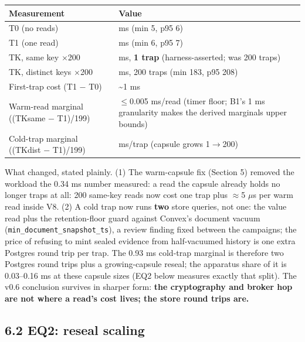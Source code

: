 \documentclass[
  11pt,
]{article}
\newcounter{none} %
\begin{document}
{\def\LTcaptype{none} %
\begin{longtable}[]{@{}
  >{\raggedright\arraybackslash}p{}
  >{\raggedright\arraybackslash}p{}@{}}
\toprule\noalign{}
\begin{minipage}[b]{\linewidth}\raggedright
Measurement
\end{minipage} & \begin{minipage}[b]{\linewidth}\raggedright
Value
\end{minipage} \\
\midrule\noalign{}
\endhead
\bottomrule\noalign{}
\endlastfoot
T0 (no reads) & 5 ms (min 5, p95 6) \\
T1 (one read) & 6 ms (min 6, p95 7) \\
TK, same key $\times$200 & 7 ms, \textbf{1 trap} (harness-asserted; was 200 traps) \\
TK, distinct keys $\times$200 & 191 ms, 200 traps (min 183, p95 208) \\
First-trap cost (T1 $-$ T0) & \textasciitilde1 ms \\
Warm-read marginal ((TKsame $-$ T1)/199) & $\le$0.005 ms/read (timer floor; B1's 1 ms granularity makes the derived marginals upper bounds) \\
Cold-trap marginal ((TKdist $-$ T1)/199) & 0.93 ms/trap (capsule grows 1$\rightarrow$200) \\
\end{longtable}
}

What changed, stated plainly. (1) The warm-capsule fix (Section 5) removed the workload the 0.34 ms number measured: a read the capsule already holds no longer traps at all: 200 same-key reads now cost one trap plus $\approx$5 $\mu$s per warm read inside V8. (2) A cold trap now runs \textbf{two} store queries, not one: the value read plus the retention-floor guard against Convex's document vacuum (\texttt{min\_document\_snapshot\_ts}), a review finding fixed between the campaigns; the price of refusing to mint sealed evidence from half-vacuumed history is one extra Postgres round trip per trap. The 0.93 ms cold-trap marginal is therefore two Postgres round trips plus a growing-capsule reseal; the apparatus share of it is 0.03--0.16 ms at these capsule sizes (EQ2 below measures exactly that split). The v0.6 conclusion survives in sharper form: \textbf{the cryptography and broker hop are not where a read's cost lives; the store round trips are.}

\subsection{6.2 EQ2: reseal scaling}\label{eq2-reseal-scaling}
\end{document}

